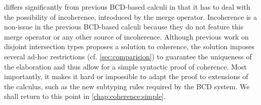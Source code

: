 
\namee differs significantly from previous BCD-based calculi in that it has to
deal with the possibility of incoherence, introduced by the merge operator. Incoherence
is a non-issue in the previous BCD-based calculi because they do not feature
this merge operator or any other source of incoherence.
Although previous work on disjoint intersection types
proposes a solution to coherence, the solution imposes several ad-hoc restrictions (cf. \cref{sec:comparision})
to guarantee the uniqueness of the elaboration and thus allow for a simple
syntactic proof of coherence. Most
importantly, it makes it hard or impossible to adapt the proof to extensions of
the calculus, such as the new subtyping rules required by the BCD system.
We shall return to this point in
\cref{chap:coherence:simple}.





% 



